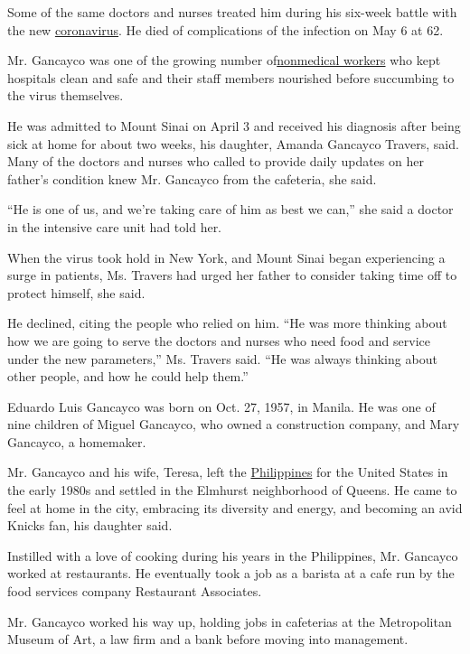 Some of the same doctors and nurses treated him during his six-week
battle with the new
\href{https://www.nytimes.com/2020/06/22/world/asia/coronavirus-philippines-priest.html}{coronavirus}.
He died of complications of the infection on May 6 at 62.

Mr. Gancayco was one of the growing number
of\href{https://www.nytimes.com/2020/05/04/nyregion/coronavirus-ny-hospital-workers.html}{nonmedical
workers} who kept hospitals clean and safe and their staff members
nourished before succumbing to the virus themselves.

He was admitted to Mount Sinai on April 3 and received his diagnosis
after being sick at home for about two weeks, his daughter, Amanda
Gancayco Travers, said. Many of the doctors and nurses who called to
provide daily updates on her father's condition knew Mr. Gancayco from
the cafeteria, she said.

``He is one of us, and we're taking care of him as best we can,'' she
said a doctor in the intensive care unit had told her.

When the virus took hold in New York, and Mount Sinai began experiencing
a surge in patients, Ms. Travers had urged her father to consider taking
time off to protect himself, she said.

He declined, citing the people who relied on him. ``He was more thinking
about how we are going to serve the doctors and nurses who need food and
service under the new parameters,'' Ms. Travers said. ``He was always
thinking about other people, and how he could help them.''

Eduardo Luis Gancayco was born on Oct. 27, 1957, in Manila. He was one
of nine children of Miguel Gancayco, who owned a construction company,
and Mary Gancayco, a homemaker.

Mr. Gancayco and his wife, Teresa, left the
\href{https://www.nytimes.com/2020/06/22/world/asia/coronavirus-philippines-priest.html}{Philippines}
for the United States in the early 1980s and settled in the Elmhurst
neighborhood of Queens. He came to feel at home in the city, embracing
its diversity and energy, and becoming an avid Knicks fan, his daughter
said.

Instilled with a love of cooking during his years in the Philippines,
Mr. Gancayco worked at restaurants. He eventually took a job as a
barista at a cafe run by the food services company Restaurant
Associates.

Mr. Gancayco worked his way up, holding jobs in cafeterias at the
Metropolitan Museum of Art, a law firm and a bank before moving into
management.

